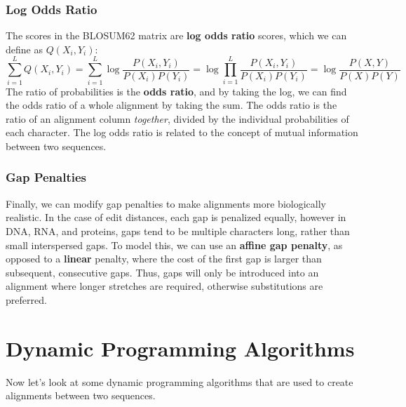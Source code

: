 \documentclass[12pt]{article}
\begin{document}
\subsubsection{Log Odds Ratio}
The scores in the BLOSUM62 matrix are \textbf{log odds ratio} scores, which we can define as $Q(X_i,Y_i)$:
$$\sum_{i=1}^LQ(X_i,Y_i) = \sum_{i=1}^L\log \frac{P\left(X_i,Y_i\right)}{P\left(X_i\right)P\left(Y_i\right)} = \log\prod_{i=1}^L\frac{P\left(X_i,Y_i\right)}{P\left(X_i\right)P\left(Y_i\right)} = \log\frac{P\left(X,Y\right)}{P\left(X\right)P\left(Y\right)}$$
The ratio of probabilities is the \textbf{odds ratio}, and by taking the log, we can find the odds ratio of a whole alignment by taking the sum. The odds ratio is the ratio of an alignment column \textit{together}, divided by the individual probabilities of each character. The log odds ratio is related to the concept of mutual information between two sequences.
\subsubsection{Gap Penalties}
Finally, we can modify gap penalties to make alignments more biologically realistic. In the case of edit distances, each gap is penalized equally, however in DNA, RNA, and proteins, gaps tend to be multiple characters long, rather than small interspersed gaps. To model this, we can use an \textbf{affine gap penalty}, as opposed to a \textbf{linear} penalty, where the cost of the first gap is larger than subsequent, consecutive gaps. Thus, gaps will only be introduced into an alignment where longer stretches are required, otherwise substitutions are preferred.

\section{Dynamic Programming Algorithms}
Now let's look at some dynamic programming algorithms that are used 
to create alignments between two sequences. 
\end{document}
